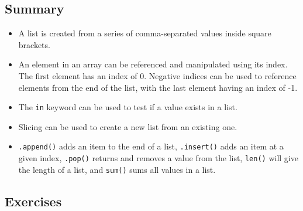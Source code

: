 \documentclass[11pt]{cselabheader}
\begin{document}
\subsection{Summary}
\begin{itemize}
  \item A list is created from a series of comma-separated values inside square brackets.
  \item An element in an array can be referenced and manipulated using its index. The first element has an index of 0. Negative indices can be used to reference elements from the end of the list, with the last element having an index of -1.
  \item The \lstinline{in} keyword can be used to test if a value exists in a list.
  \item Slicing can be used to create a new list from an existing one.
  \item \lstinline{.append()} adds an item to the end of a list, \lstinline{.insert()} adds an item at a given index, \lstinline{.pop()} returns and removes a value from the list, \lstinline{len()} will give the length of a list, and \lstinline{sum()} sums all values in a list.
\end{itemize}

\subsection{Exercises}
\label{subsec:listsex}
\end{document}
